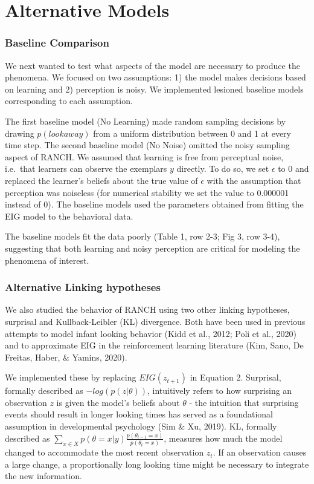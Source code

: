 \documentclass[10pt, letterpaper]{article}
\begin{document}
\hypertarget{alternative-models}{%
\section{Alternative Models}\label{alternative-models}}

\hypertarget{baseline-comparison}{%
\subsubsection{Baseline Comparison}\label{baseline-comparison}}

We next wanted to test what aspects of the model are necessary to
produce the phenomena. We focused on two assumptions: 1) the model makes
decisions based on learning and 2) perception is noisy. We implemented
lesioned baseline models corresponding to each assumption.

The first baseline model (No Learning) made random sampling decisions by
drawing \(p(look away)\) from a uniform distribution between 0 and 1 at
every time step. The second baseline model (No Noise) omitted the noisy
sampling aspect of RANCH. We assumed that learning is free from
perceptual noise, i.e.~that learners can observe the exemplars \(y\)
directly. To do so, we set \(\epsilon\) to 0 and replaced the learner's
beliefs about the true value of \(\epsilon\) with the assumption that
perception was noiseless (for numerical stability we set the value to
0.000001 instead of 0). The baseline models used the parameters obtained
from fitting the EIG model to the behavioral data.

The baseline models fit the data poorly (Table 1, row 2-3; Fig 3, row
3-4), suggesting that both learning and noisy perception are critical
for modeling the phenomena of interest.

\hypertarget{alternative-linking-hypotheses}{%
\subsubsection{Alternative Linking
hypotheses}\label{alternative-linking-hypotheses}}

We also studied the behavior of RANCH using two other linking
hypotheses, surprisal and Kullback-Leibler (KL) divergence. Both have
been used in previous attempts to model infant looking behavior (Kidd et
al., 2012; Poli et al., 2020) and to approximate EIG in the
reinforcement learning literature (Kim, Sano, De Freitas, Haber, \&
Yamins, 2020).

We implemented these by replacing \(EIG(z_{t+1})\) in Equation 2.
Surprisal, formally described as \(-log(p(z|\theta))\), intuitively
refers to how surprising an observation \(z\) is given the model's
beliefs about \(\theta\) - the intuition that surprising events should
result in longer looking times has served as a foundational assumption
in developmental psychology (Sim \& Xu, 2019). KL, formally described as
\(\sum_{x \in X}{p(\theta = x|y)\frac{p(\theta_{t-1} = x)}{p(\theta_t = x)}}\),
measures how much the model changed to accommodate the most recent
observation \(z_t\). If an observation causes a large change, a
proportionally long looking time might be necessary to integrate the new
information.
\end{document}
